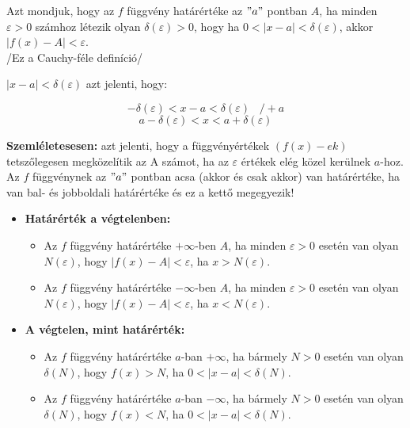 \documentclass[11pt,a4paper]{article}
\begin{document}
\begin{tcolorbox}[colback=green!5!white,colframe=green!60!black,title= 2. Függvény határérték]
Azt mondjuk, hogy az \(f\) függvény határértéke az \("a"\) pontban \(A\), ha minden \(\varepsilon > 0\) számhoz
létezik olyan \(\delta(\varepsilon)  > 0\), hogy ha \(0 < \left\lvert x-a \right\rvert  < \delta(\varepsilon)\), akkor \(|f(x) - A| < \varepsilon\).\\
/Ez a Cauchy-féle definíció/\\
\begin{center}
    \(|x - a| < \delta(\varepsilon)\) azt jelenti, hogy:
\end{center}
    $$- \delta(\varepsilon) < x - a < \delta(\varepsilon) \hspace{10pt} /+a$$
    $$a - \delta(\varepsilon) < x < a + \delta(\varepsilon)$$

\textbf{Szemléletesesen:} azt jelenti, hogy a függvényértékek \((f(x)-ek)\) tetszőlegesen megközelítik az
A számot, ha az \(\varepsilon\) értékek elég közel kerülnek \(a\)-hoz. Az \(f\) függvénynek az \("a"\) pontban acsa (akkor és csak akkor) van határértéke, ha van bal- és
jobboldali határértéke és ez a kettő megegyezik!
\begin{itemize}
    \item \textbf{Határérték a végtelenben:}
    \begin{itemize}
        \item Az \(f\) függvény határértéke \(+\infty\)-ben \(A\), ha minden \(\varepsilon > 0\) esetén van olyan \(N(\varepsilon)\), hogy
    \(|f(x) - A| < \varepsilon\), ha \(x > N(\varepsilon)\).
        \item Az \(f\) függvény határértéke \(-\infty\)-ben \(A\), ha minden \(\varepsilon > 0\) esetén van olyan \(N(\varepsilon)\), hogy
    \(|f(x) - A| < \varepsilon\), ha \(x < N(\varepsilon)\).
    \end{itemize}
    \item \textbf{A végtelen, mint határérték:}
    \begin{itemize}
        \item Az \(f\) függvény határértéke \(a\)-ban \(+ \infty\), ha bármely \(N > 0\) esetén van olyan \(\delta(N)\), hogy \(f(x) > N\), ha \(0 < |x - a| < \delta(N)\).
        \item Az \(f\) függvény határértéke \(a\)-ban \(- \infty\), ha bármely \(N > 0\) esetén van olyan \(\delta(N)\), hogy \(f(x) < N\), ha \(0 < |x - a| < \delta(N)\).
    \end{itemize}
\end{itemize}
\end{tcolorbox}
\end{document}
